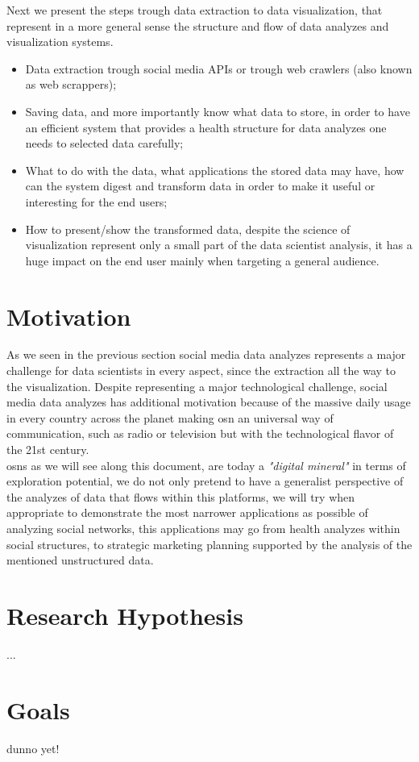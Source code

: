 Next we present the steps trough data extraction to data visualization, that represent in a more general sense the structure and flow of data analyzes and visualization systems.

\begin{itemize}
\item Data extraction trough social media APIs or trough web crawlers (also known as web scrappers);
\item Saving data, and more importantly know what data to store, in order to have an efficient system that provides a health structure for data analyzes one needs
to selected data carefully;
\item What to do with the data, what applications the stored data may have, how can the system digest and transform data in order to make it useful or interesting for the end users;
\item How to present/show the transformed data, despite the science of visualization represent only a small part of the data scientist analysis, it has a huge impact on the end user mainly when targeting a general audience.
\end{itemize}

\section{Motivation}
As we seen in the previous section social media data analyzes represents a major challenge for data scientists in every aspect, since the extraction all the way to the visualization. Despite representing a major technological challenge, social media data analyzes has additional motivation because of the massive daily usage in every country across the planet making \gls{osn} an universal way of communication, such as radio or television but with the
technological flavor of the 21st century.\\
\indent \glspl{osn} as we will see along this document, are today a \textit{"digital mineral"} in terms of exploration potential, we do not only pretend to have a generalist perspective of the analyzes of data that flows within this platforms, we will try when appropriate to demonstrate the most narrower applications as possible of analyzing social networks, this applications may go from health analyzes within social structures, to strategic marketing planning supported by the analysis of the mentioned unstructured data.

\section{Research Hypothesis}
...

\section{Goals}
dunno yet!
